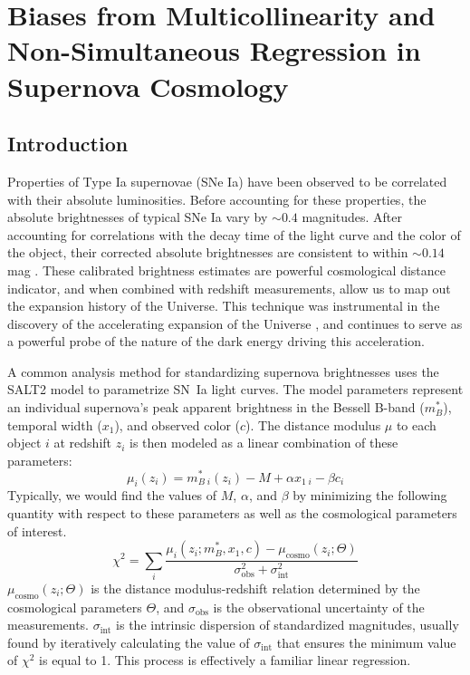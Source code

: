 \chapter{Biases from Multicollinearity and Non-Simultaneous Regression in Supernova Cosmology}

\newcommand{\sgn}{\text{sgn}}
\newcommand{\sigint}{\sigma_{\text{int}}}

\section{Introduction} \label{sec:intro}
Properties of Type Ia supernovae (SNe Ia) have been observed to be correlated with their absolute luminosities. Before accounting for these properties, the absolute brightnesses of typical SNe Ia vary by $\sim 0.4$ magnitudes. After accounting for correlations with the decay time of the light curve and the color of the object, their corrected absolute brightnesses are consistent to within $\sim 0.14$ mag \parencite{Phillips93, Hamuy96, Riess96, Perlmutter97}. These calibrated brightness estimates are powerful cosmological distance indicator, and when combined with redshift measurements, allow us to map out the expansion history of the Universe. This technique was instrumental in the discovery of the accelerating expansion of the Universe \parencite{Perlmutter99, Riess98}, and continues to serve as a powerful probe of the nature of the dark energy driving this acceleration.

A common analysis method for standardizing supernova brightnesses uses the SALT2 model \parencite{Guy07, Betoule14, Mosher14} to parametrize SN~Ia light curves. The model parameters represent an individual supernova's peak apparent brightness in the Bessell B-band ($m_B^*$), temporal width ($x_1$), and observed color ($c$). The distance modulus $\mu$ to each object $i$ at redshift $z_i$ is then modeled as a linear combination of these parameters:
\begin{equation}
    \mu_i(z_i) = m_{B\;i}^*(z_i) - M + \alpha x_{1\;i} - \beta c_i
\end{equation}
Typically, we would find the values of $M$, $\alpha$, and $\beta$ by minimizing the following quantity with respect to these parameters as well as the cosmological parameters of interest.
\begin{equation}
    \chi^2 = \displaystyle\sum_{i} \frac{\mu_i(z_i; m_B^*, x_1, c)-\mu_\text{cosmo}(z_i; \Theta)}{\sigma_\text{obs}^2+\sigint^2}
\end{equation}
$\mu_\text{cosmo}(z_i;\Theta)$ is the distance modulus-redshift relation determined by the cosmological parameters $\Theta$, and $\sigma_\text{obs}$ is the observational uncertainty of the measurements. $\sigma_\text{int}$ is the intrinsic dispersion of standardized magnitudes, usually found by iteratively calculating  the value of $\sigint$ that ensures the minimum value of $\chi^2$ is equal to 1. This process is effectively a familiar linear regression.

